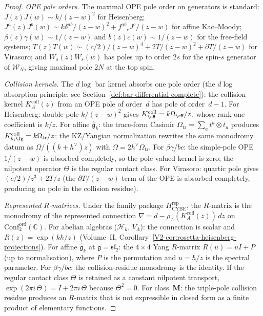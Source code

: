 \begin{proof}
\emph{OPE pole orders.} The maximal OPE pole order on generators
is standard:
$J(z)J(w) \sim k/(z{-}w)^2$ for Heisenberg;
$J^a(z)J^b(w) \sim k\delta^{ab}/(z{-}w)^2 + f^{ab}{}_c J^c/(z{-}w)$
for affine Kac--Moody;
$\beta(z)\gamma(w) \sim 1/(z{-}w)$ and
$b(z)c(w) \sim 1/(z{-}w)$ for the free-field systems;
$T(z)T(w) \sim (c/2)/(z{-}w)^4 + 2T/(z{-}w)^2 + \partial T/(z{-}w)$
for Virasoro; and
$W_s(z)W_s(w)$ has poles up to order $2s$ for the
spin-$s$ generator of $\mathcal{W}_N$, giving
maximal pole $2N$ at the top spin.

\emph{Collision kernels.}
The $d\log$ bar kernel absorbs one pole order
(the $d\log$ absorption principle; see Section~\ref{def:bar-differential-complete}):
the collision kernel $K_A^{\mathrm{coll}}(z)$ from an OPE pole of
order~$d$ has pole of order~$d{-}1$. For Heisenberg:
double-pole $k/(z{-}w)^2$ gives
$K_{\cH}^{\mathrm{coll}}=k\Omega_{\cH}/z$, whose rank-one coefficient
is $k/z$.
For affine $\widehat{\mathfrak{g}}_k$: the trace-form Casimir
$\Omega_{\mathrm{tr}} = \sum_a t^a \otimes t_a$ produces
$K_{k,\fg}^{\mathrm{coll}} = k\Omega_{\mathrm{tr}}/z$; the KZ/Yangian
normalization rewrites the same monodromy datum as
$\Omega/((k+h^\vee)z)$ with $\Omega=2h^\vee\Omega_{\mathrm{tr}}$.
For $\beta\gamma$/$bc$: the simple-pole OPE $1/(z{-}w)$ is absorbed
completely, so the pole-valued kernel is zero; the nilpotent operator
$\Theta$ is the regular contact class.
For Virasoro: quartic pole gives
$(c/2)/z^3 + 2T/z$ (the $\partial T/(z{-}w)$ term of the OPE is
absorbed completely, producing no pole in the collision residue).

\emph{Represented $R$-matrices.}
Under the family package $H_{\mathrm{CYBE}}^{\mathrm{rep}}$, the
$R$-matrix is the monodromy of the represented connection
$\nabla=d-\rho_A(K_A^{\mathrm{coll}}(z))\,dz$ on
$\mathrm{Conf}_2^{\mathrm{ord}}(\mathbb{C})$.
For abelian algebras ($\mathcal{H}_k$, $V_\Lambda$):
the connection is scalar and
$R(z) = \exp(k\hbar/z)$
(Volume~II, Corollary~\ref*{V2-cor:rosetta-heisenberg-projections}).
For affine $\widehat{\mathfrak{g}}_k$ at $\mathfrak{g}
= \mathfrak{sl}_2$: the $4 \times 4$ Yang $R$-matrix
$R(u) = uI + P$ (up to normalisation), where $P$ is
the permutation and $u = \hbar/z$ is the spectral parameter.
For $\beta\gamma$/$bc$: the collision-residue monodromy is the identity.
If the regular contact class $\Theta$ is retained as a constant
nilpotent transport, $\exp(2\pi i\,\Theta)=I+2\pi i\,\Theta$ because
$\Theta^2=0$.
For class~$\mathbf{M}$: the triple-pole collision residue
produces an $R$-matrix that is not expressible in closed form
as a finite product of elementary functions.


\end{proof}
